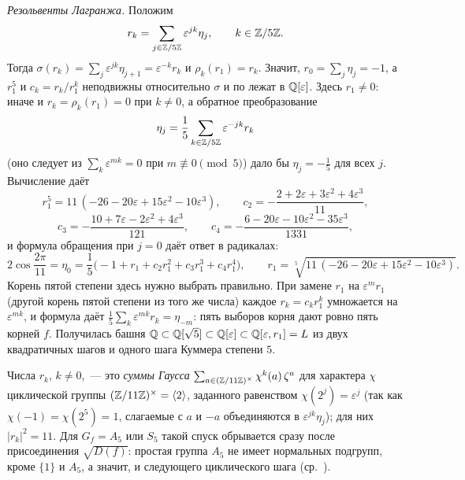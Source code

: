 \begin{aside}
\emph{Резольвенты Лагранжа.} Положим
\[
r_k=\sum_{j\in\mathbb Z/5\mathbb Z}\varepsilon^{jk}\eta_j,\qquad k\in\mathbb Z/5\mathbb Z .
\]
Тогда $\sigma(r_k)=\sum_j\varepsilon^{jk}\eta_{j+1}=\varepsilon^{-k}r_k$ и $\rho_k(r_1)=r_k$. Значит, $r_0=\sum_j\eta_j=-1$, а
$r_1^5$ и $c_k=r_k/r_1^k$ неподвижны относительно $\sigma$ и по  лежат в $\mathbb Q[\varepsilon]$. Здесь $r_1\ne0$: иначе и
$r_k=\rho_k(r_1)=0$ при $k\ne0$, а обратное преобразование
\[
\eta_j=\frac15\sum_{k\in\mathbb Z/5\mathbb Z}\varepsilon^{-jk}r_k
\]
(оно следует из $\sum_k\varepsilon^{mk}=0$ при $m\not\equiv0\pmod5$) дало бы $\eta_j=-\frac15$ для всех $j$. Вычисление даёт
\[
r_1^5=11\,(-26-20\varepsilon+15\varepsilon^2-10\varepsilon^3),\qquad
c_2=-\frac{2+2\varepsilon+3\varepsilon^2+4\varepsilon^3}{11},
\]
\[
c_3=-\frac{10+7\varepsilon-2\varepsilon^2+4\varepsilon^3}{121},\qquad
c_4=-\frac{6-20\varepsilon-10\varepsilon^2-35\varepsilon^3}{1331},
\]
и формула обращения при $j=0$ даёт ответ в радикалах:
\[
2\cos\frac{2\pi}{11}=\eta_0=\frac15\bigl(-1+r_1+c_2r_1^2+c_3r_1^3+c_4r_1^4\bigr),\qquad r_1=\sqrt[5]{11\,(-26-20\varepsilon+15\varepsilon^2-10\varepsilon^3)} .
\]
Корень пятой степени здесь нужно выбрать правильно. При замене $r_1$ на $\varepsilon^mr_1$ (другой корень пятой степени
из того же числа) каждое $r_k=c_kr_1^k$ умножается на $\varepsilon^{mk}$, и формула даёт
$\frac15\sum_k\varepsilon^{mk}r_k=\eta_{-m}$: пять выборов корня дают ровно пять корней $f$. Получилась башня
$\mathbb Q\subset\mathbb Q[\sqrt5]\subset\mathbb Q[\varepsilon]\subset\mathbb Q[\varepsilon,r_1]=L$ из двух квадратичных шагов и одного шага Куммера
степени $5$.

Числа $r_k$, $k\ne0$,~--- это \emph{суммы Гаусса} $\sum_{a\in(\mathbb Z/11\mathbb Z)^\times}\chi^k(a)\,\zeta^a$ для характера $\chi$ циклической
группы $(\mathbb Z/11\mathbb Z)^\times=\langle2\rangle$, заданного равенством $\chi(2^j)=\varepsilon^j$ (так как $\chi(-1)=\chi(2^5)=1$, слагаемые
с $a$ и $-a$ объединяются в $\varepsilon^{jk}\eta_j$); для них $|r_k|^2=11$. Для $G_f=A_5$ или $S_5$ такой спуск обрывается
сразу после присоединения $\sqrt{D(f)}$: простая группа $A_5$ не имеет нормальных подгрупп, кроме $\{1\}$ и $A_5$, а значит,
и следующего циклического шага (ср.\ ).
\end{aside}
